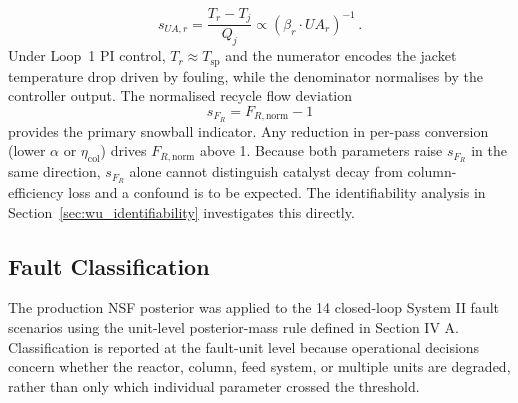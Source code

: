 \documentclass[aps,pre,twocolumn,superscriptaddress,floatfix]{revtex4-2}
\begin{document}
\begin{equation}
  s_{UA,r} = \frac{T_r - T_j}{Q_j} \propto (\beta_r\!\cdot\!U\!A_r)^{-1} \, .
  \label{eq:wu_ua_proxy}
\end{equation}
%
Under Loop~1 PI control,
$T_r \approx T_\mathrm{sp}$ and the numerator encodes the jacket temperature
drop driven by fouling, while the denominator normalises by the controller
output.  The normalised recycle flow deviation
%
\begin{equation}
  s_{F_R} = F_{R,\mathrm{norm}} - 1
  \label{eq:wu_fr_proxy}
\end{equation}
%
provides the primary snowball indicator. Any reduction in per-pass conversion (lower $\alpha$ or $\eta_\mathrm{col}$) drives $F_{R,\mathrm{norm}}$ above 1.
Because both parameters raise $s_{F_R}$ in the same direction, $s_{F_R}$ alone cannot distinguish catalyst decay from column-efficiency loss and a confound is to be expected. The identifiability analysis in Section~\ref{sec:wu_identifiability} investigates this directly.

\subsection{Fault Classification}
\label{sec:wu_fault_class}

The production NSF posterior was applied to the 14 closed-loop System II fault
scenarios using the unit-level posterior-mass rule defined in Section IV A.
Classification is reported at the fault-unit level because operational
decisions concern whether the reactor, column, feed system, or multiple
units are degraded, rather than only which individual parameter crossed the 
threshold.
\end{document}
